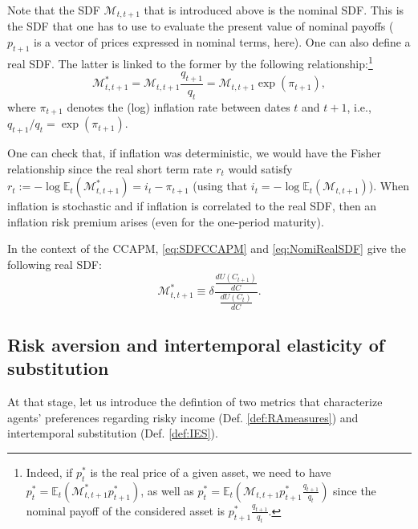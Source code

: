 \documentclass[
  12pt,
]{book}
\theoremstyle{definition}
\theoremstyle{definition}
\theoremstyle{definition}
\theoremstyle{definition}
\theoremstyle{remark}
\begin{document}
Note that the SDF \(\mathcal{M}_{t,t+1}\) that is introduced above is the nominal SDF. This is the SDF that one has to use to evaluate the present value of nominal payoffs (\(p_{t+1}\) is a vector of prices expressed in nominal terms, here). One can also define a real SDF. The latter is linked to the former by the following relationship:\footnote{Indeed, if \(p_t^*\) is the real price of a given asset, we need to have \(p_t^* = \mathbb{E}_t(\mathcal{M}^*_{t,t+1} p^*_{t+1})\), as well as \(p_t^* = \mathbb{E}_t\left(\mathcal{M}_{t,t+1} p^*_{t+1}\frac{q_{t+1}}{q_t}\right)\) since the nominal payoff of the considered asset is \(p^*_{t+1}\frac{q_{t+1}}{q_t}\).}
\begin{equation}
\mathcal{M}^*_{t,t+1} = \mathcal{M}_{t,t+1}\frac{q_{t+1}}{q_{t}} = \mathcal{M}_{t,t+1}\exp(\pi_{t+1}), \label{eq:NomiRealSDF}
\end{equation}
where \(\pi_{t+1}\) denotes the (log) inflation rate between dates \(t\) and \(t+1\), i.e., \(q_{t+1}/q_t=\exp(\pi_{t+1})\).

One can check that, if inflation was deterministic, we would have the Fisher relationship since the real short term rate \(r_t\) would satisfy \(r_t := -\log \mathbb{E}_t(\mathcal{M}^*_{t,t+1}) = i_t - \pi_{t+1}\) (using that \(i_t = -\log \mathbb{E}_t(\mathcal{M}_{t,t+1})\)). When inflation is stochastic and if inflation is correlated to the real SDF, then an inflation risk premium arises (even for the one-period maturity).

In the context of the CCAPM, \eqref{eq:SDFCCAPM} and \eqref{eq:NomiRealSDF} give the following real SDF:
\begin{equation}
\boxed{\mathcal{M}_{t,t+1}^* \equiv \delta
\frac{  \frac{dU(C_{t+1})}{dC}} {
\frac{dU(C_t)}{dC}}.}\label{eq:realSDFCCAPM}
\end{equation}

\hypertarget{risk-aversion-and-intertemporal-elasticity-of-substitution}{%
\subsection{Risk aversion and intertemporal elasticity of substitution}\label{risk-aversion-and-intertemporal-elasticity-of-substitution}}

At that stage, let us introduce the defintion of two metrics that characterize agents' preferences regarding risky income (Def. \ref{def:RAmeasures}) and intertemporal substitution (Def. \ref{def:IES}).
\end{document}
